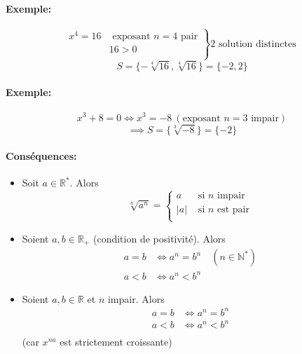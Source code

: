 \documentclass[
    11pt,
    a4paper,
    oneside,
    headinlcude, footinclude,
    twoside,
]{report}
\begin{document}
\paragraph{Exemple:}

$$
\left.
    \begin{array}{rl}
    x^{4} = 16 & \text{ exposant $n = 4$  pair}\\
     & 16 > 0\\
    \end{array}
\right\} 2 \text{ solution distinctes }
$$
$$S = \{-\sqrt[4]{16}, \sqrt[4]{16}\} = \{-2, 2\}$$

\paragraph{Exemple:}

$$x^{3} + 8 = 0 \iff x^{3} = -8\ (\text{exposant $n = 3$ impair})$$
$$\implies S = \{\sqrt[3]{-8}\} = \{-2\}$$

\paragraph{Conséquences:}

\begin{itemize}
    \item Soit $a \in \mathbb{R}^{*}$. Alors 
        $$
        \sqrt[n]{a^{n}} = 
        \left\{
            \begin{array}{ll}
                a & \text{ si $n$ impair }\\
                |a| & \text{ si $n$ est pair}\\
            \end{array}
        \right.
        $$

    \item Soient $a, b \in \mathbb{R}_{+}$ (condition de positivité). Alors 
        \[
            \begin{split}
                a = b &\iff a^{n} = b^{n} \quad (n \in \mathbb{N}^{*})\\
                a < b &\iff a^{n} < b^{n}
            \end{split}
        \]

    \item Soient $a, b \in \mathbb{R}$ et $n$ impair. Alors 
        \[
            \begin{split}
                a = b &\iff a^{n} = b^{n}\\
                a < b &\iff a^{n} < b^{n}\\
            \end{split}
        \]
        (car $x^{na}$ est strictement croissante)
\end{itemize}
\end{document}
